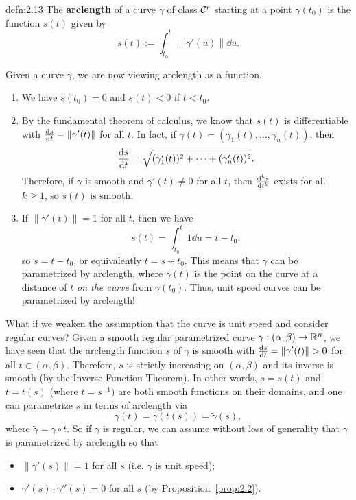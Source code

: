 \begin{defn}{defn:2.13}
    The {\bf arclength} of a curve $\gamma$ of class ${\cal C}^r$ starting 
    at a point $\gamma(t_0)$ is the function $s(t)$ given by 
    \[ s(t) := \int_{t_0}^t \|\gamma'(u)\|\dd u. \] 
\end{defn}\vspace{-0.25cm}

Given a curve $\gamma$, we are now viewing arclength as a function.
\begin{enumerate}[(1)]
    \item We have $s(t_0) = 0$ and $s(t) < 0$ if $t < t_0$. 
    \item By the fundamental theorem of calculus, we know that $s(t)$ is 
    differentiable with $\frac{{\rm d}s}{{\rm d}t} = \|\gamma'(t)\|$ for all 
    $t$. In fact, if $\gamma(t) = (\gamma_1(t), \dots, \gamma_n(t))$, then 
    \[ \frac{{\rm d}s}{{\rm d}t} = \sqrt{(\gamma'_1(t))^2 + \cdots + 
    (\gamma'_n(t))^2}. \] 
    Therefore, if $\gamma$ is smooth and $\gamma'(t) \neq 0$ for all $t$, 
    then $\frac{{\rm d}^k s}{{\rm d}t^k}$ exists for all $k \geq 1$, 
    so $s(t)$ is smooth.
    \item If $\|\gamma'(t)\| = 1$ for all $t$, then we have 
    \[ s(t) = \int_{t_0}^t 1\dd u = t - t_0, \] 
    so $s = t - t_0$, or equivalently $t = s + t_0$. This means that 
    $\gamma$ can be parametrized by arclength, where $\gamma(t)$ 
    is the point on the curve at a distance of $t$ \emph{on the curve} 
    from $\gamma(t_0)$. Thus, unit speed curves can be parametrized by 
    arclength!
\end{enumerate}

What if we weaken the assumption that the curve is unit speed 
and consider regular curves?
Given a smooth regular parametrized curve $\gamma : (\alpha, \beta) \to \mathbb{R}^n$, 
we have seen that the arclength function $s$ of $\gamma$ is smooth with 
$\frac{{\rm d}s}{{\rm d}t} = \|\gamma'(t)\| > 0$ for all $t \in (\alpha, \beta)$.
Therefore, $s$ is strictly increasing on $(\alpha, \beta)$ and its inverse 
is smooth (by the Inverse Function Theorem). In other words, 
$s = s(t)$ and $t = t(s)$ (where $t = s^{-1})$ are both smooth functions 
on their domains, and one can parametrize $s$ in terms of arclength via 
\[ \gamma(t) = \gamma(t(s)) = \tilde\gamma(s), \] 
where $\tilde\gamma = \gamma \circ t$. So if $\gamma$ is regular, we can 
assume without loss of generality that $\gamma$ is parametrized by arclength 
so that 
\begin{itemize}
    \item $\|\gamma'(s)\| = 1$ for all $s$ (i.e. $\gamma$ is unit speed);
    \item $\gamma'(s) \cdot \gamma''(s) = 0$ for all $s$ (by Proposition~\ref{prop:2.2}).
\end{itemize}

